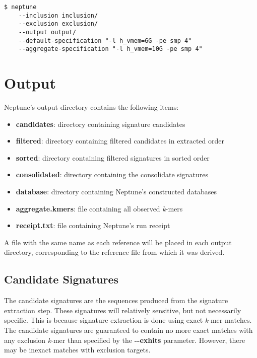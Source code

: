 \documentclass[a4paper,10pt]{article}
\begin{document}
\begin{minipage}{\linewidth}
\begin{lstlisting}[frame=single, style=bash]
$ neptune
    --inclusion inclusion/
    --exclusion exclusion/
    --output output/
    --default-specification "-l h_vmem=6G -pe smp 4"
    --aggregate-specification "-l h_vmem=10G -pe smp 4"
\end{lstlisting}
\end{minipage}


\newpage
\section{Output}
\label{section:output}

Neptune's output directory contains the following items:

\begin{itemize}
  \item \textbf{candidates}: directory containing signature candidates
  \item \textbf{filtered}: directory containing filtered candidates in extracted order
  \item \textbf{sorted}: directory containing filtered signatures in sorted order
  \item \textbf{consolidated}: directory containing the consolidate signatures
  \item \textbf{database}: directory containing Neptune's constructed databases
  \item \textbf{aggregate.kmers}: file containing all observed \textit{k}-mers
  \item \textbf{receipt.txt}: file containing Neptune's run receipt
\end{itemize}

A file with the same name as each reference will be placed in each output directory, corresponding to the reference file from which it was derived.

\subsection{Candidate Signatures}

The candidate signatures are the sequences produced from the signature extraction step. These signatures will relatively sensitive, but not necessarily specific. This is because signature extraction is done using exact \textit{k}-mer matches. The candidate signatures are guaranteed to contain no more exact matches with any exclusion \textit{k}-mer than specified by the \mbox{\textbf{-{}-exhits}} parameter. However, there may be inexact matches with exclusion targets.
\end{document}
